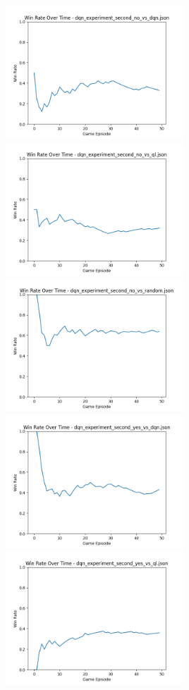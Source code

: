 \includegraphics[width=0.5\textwidth]{images/win_rate_dqn_experiment_second_no_vs_dqn.png} 
\includegraphics[width=0.5\textwidth]{images/win_rate_dqn_experiment_second_no_vs_ql.png} 
\includegraphics[width=0.5\textwidth]{images/win_rate_dqn_experiment_second_no_vs_random.png} 
\includegraphics[width=0.5\textwidth]{images/win_rate_dqn_experiment_second_yes_vs_dqn.png} 
\includegraphics[width=0.5\textwidth]{images/win_rate_dqn_experiment_second_yes_vs_ql.png} 
